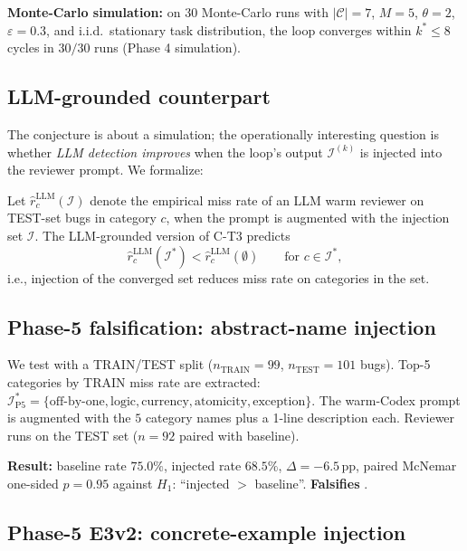 \textbf{Monte-Carlo simulation:} on $30$ Monte-Carlo runs with $|\mathcal{C}| = 7$, $M = 5$, $\theta = 2$, $\varepsilon = 0.3$, and i.i.d.\ stationary task distribution, the loop converges within $k^\ast \le 8$ cycles in $30/30$ runs (Phase 4 simulation).

\subsection{LLM-grounded counterpart}

The conjecture is about a simulation; the operationally interesting question is whether \emph{LLM detection improves} when the loop's output $\mathcal{I}^{(k)}$ is injected into the reviewer prompt. We formalize:

Let $\hat{r}_c^{\text{LLM}}(\mathcal{I})$ denote the empirical miss rate of an LLM warm reviewer on TEST-set bugs in category $c$, when the prompt is augmented with the injection set $\mathcal{I}$. The LLM-grounded version of C-T3 predicts
\begin{equation}
  \hat{r}_c^{\text{LLM}}(\mathcal{I}^\ast) < \hat{r}_c^{\text{LLM}}(\emptyset) \qquad \text{for } c \in \mathcal{I}^\ast,
  \label{eq:ct3-llm}
\end{equation}
i.e., injection of the converged set reduces miss rate on categories in the set.

\subsection{Phase-5 falsification: abstract-name injection}

We test  with a TRAIN/TEST split ($n_{\text{TRAIN}} = 99$, $n_{\text{TEST}} = 101$ bugs). Top-5 categories by TRAIN miss rate are extracted: $\mathcal{I}^\ast_{\text{P5}} = \{\text{off-by-one}, \text{logic}, \text{currency}, \text{atomicity}, \text{exception}\}$. The warm-Codex prompt is augmented with the $5$ category names plus a 1-line description each. Reviewer runs on the TEST set ($n = 92$ paired with baseline).

\textbf{Result:} baseline rate $75.0\%$, injected rate $68.5\%$, $\Delta = -6.5\,\mathrm{pp}$, paired McNemar one-sided $p = 0.95$ against $H_1$: ``injected $>$ baseline''. \textbf{Falsifies} .

\subsection{Phase-5 E3v2: concrete-example injection}

